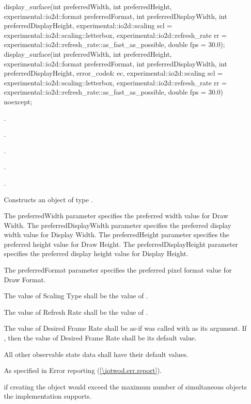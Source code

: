 \begin{itemdecl}
display_surface(int preferredWidth, int preferredHeight, 
  experimental::io2d::format preferredFormat,
  int preferredDisplayWidth, int preferredDisplayHeight,
  experimental::io2d::scaling scl = experimental::io2d::scaling::letterbox,
    experimental::io2d::refresh_rate rr =
    experimental::io2d::refresh_rate::as_fast_as_possible, double fps = 30.0);
display_surface(int preferredWidth, int preferredHeight, 
  experimental::io2d::format preferredFormat,
  int preferredDisplayWidth, int preferredDisplayHeight, error_code& ec,
  experimental::io2d::scaling scl = experimental::io2d::scaling::letterbox,
    experimental::io2d::refresh_rate rr =
    experimental::io2d::refresh_rate::as_fast_as_possible, double fps = 30.0) 
  noexcept;
\end{itemdecl}
\begin{itemdescr}
\pnum
\requires
{}.

\pnum
{}.

\pnum
{}.

\pnum
{}.

\pnum
{}.

\pnum
\effects
Constructs an object of type .

\pnum
The preferredWidth parameter specifies the preferred width value for Draw Width. The preferredDisplayWidth parameter specifies the preferred display width value for Display Width. The preferredHeight parameter specifies the preferred height value for Draw Height. The preferredDisplayHeight parameter specifies the preferred display height value for Display Height.

\pnum
The preferredFormat parameter specifies the preferred pixel format value for Draw Format.

\pnum
The value of Scaling Type shall be the value of .

\pnum
The value of Refresh Rate shall be the value of .

\pnum
The value of Desired Frame Rate shall be as-if  was called with  as its argument. If , then the value of Desired Frame Rate shall be its default value.

\pnum
All other observable state data shall have their default values.

\pnum
\throws
As specified in Error reporting (\ref{\iotwod.err.report}).

\pnum
\errors
{} if creating the  object would exceed the maximum number of simultaneous  objects the implementation supports.
\end{itemdescr}

